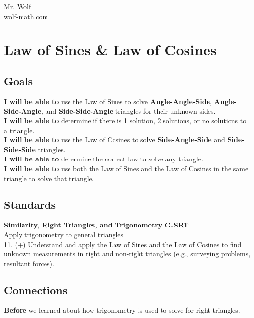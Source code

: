 \documentclass[12pt]{article}
\begin{document}
Mr. Wolf  \\ wolf-math.com

\section*{Law of Sines \& Law of Cosines}

\subsection*{Goals}

\textbf{I will be able to} use the Law of Sines to solve \textbf{Angle-Angle-Side}, \textbf{Angle-Side-Angle}, and \textbf{Side-Side-Angle} triangles for their unknown sides.\\

\textbf{I will be able to} determine if there is 1 solution, 2 solutions, or no solutions to a triangle.\\

\textbf{I will be able to} use the Law of Cosines to solve \textbf{Side-Angle-Side} and \textbf{Side-Side-Side} triangles.\\

\textbf{I will be able to} determine the correct law to solve any triangle.\\

\textbf{I will be able to} use both the Law of Sines and the Law of Cosines in the same triangle to solve that triangle.\\

\subsection*{Standards}

\textbf{Similarity, Right Triangles, and Trigonometry \hfill G-SRT}\\

Apply trigonometry to general triangles\\

11. (+) Understand and apply the Law of Sines and the Law of Cosines to find
unknown measurements in right and non-right triangles (e.g., surveying
problems, resultant forces).\\

\subsection*{Connections}

\textbf{Before} we learned about how trigonometry is used to solve for right triangles. \\
\end{document}
